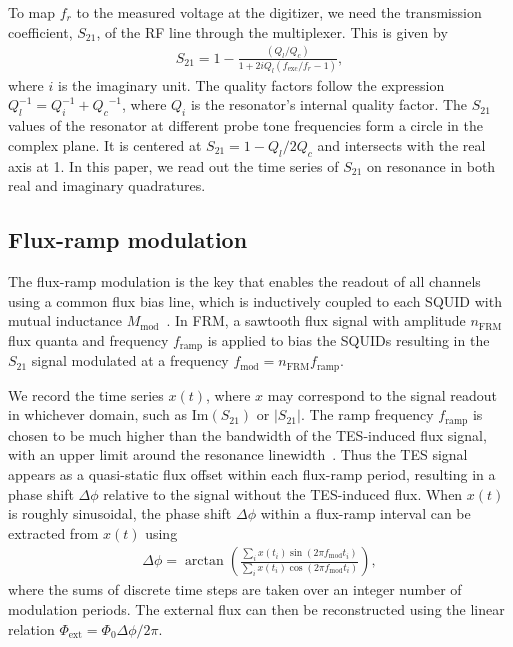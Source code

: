 \documentclass[10pt]{iopart}
\begin{document}
To map $f_r$ to the measured voltage at the digitizer, we need the transmission coefficient, $S_{21}$, of the RF line through the multiplexer. This is given by
\begin{gather} \label{eq:S_21}
    S_{21} = 1- \frac{(Q_l/Q_c)}{1+2iQ_l(f_{\text{exc}}/f_r-1)},
\end{gather}
where $i$ is the imaginary unit. The quality factors follow the expression $Q_l^{-1} = Q_i^{-1} + {Q_c}^{-1}$, where $Q_i$ is the resonator's internal quality factor. The $S_{21}$ values of the resonator at different probe tone frequencies form a circle in the complex plane. It is centered at $S_{21} = 1-Q_l/2Q_c$ and intersects with the real axis at 1. In this paper, we read out the time series of $S_{21}$ on resonance in both real and imaginary quadratures.

\subsection{Flux-ramp modulation}
\label{model:FRM}
The flux-ramp modulation is the key that enables the readout of all channels using a common flux bias line, which is inductively coupled to each SQUID with mutual inductance $M_\text{mod}$~\cite{mates_flux-ramp_2012}. In FRM, a sawtooth flux signal with amplitude $n_{\text{FRM}}$ flux quanta and frequency $f_{\mathrm{ramp}}$ is applied to bias the SQUIDs resulting in the $S_{21}$ signal modulated at a frequency \mbox{$f_{\mathrm{mod}} = n_{\text{FRM}} f_{\mathrm{ramp}}$}.

We record the time series $x(t)$, where $x$ may correspond to the signal readout in whichever domain, such as $\mathrm{Im}(S_{21})$ or $|S_{21}|$. The ramp frequency $f_{\mathrm{ramp}}$ is chosen to be much higher than the bandwidth of the TES-induced flux signal, with an upper limit around the resonance linewidth~\cite{yu_bandwidth_2022}. Thus the TES signal appears as a quasi-static flux offset within each flux-ramp period, resulting in a phase shift $\Delta \phi$ relative to the signal without the TES-induced flux. When $x(t)$ is roughly sinusoidal, the phase shift $\Delta\phi$ within a flux-ramp interval can be extracted from $x(t)$ using
\begin{gather}
    \Delta\phi = \arctan \left( \frac{\sum_i x(t_i) \sin(2\pi f_{\mathrm{mod}} t_i)}{\sum_i x(t_i) \cos(2\pi f_{\mathrm{mod}} t_i)} \right),
\end{gather}
where the sums of discrete time steps are taken over an integer number of modulation periods. The external flux can then be reconstructed using the linear relation $\Phi_{\mathrm{ext}} = \Phi_0 \Delta\phi / 2\pi$.
\end{document}
